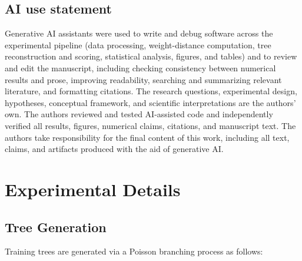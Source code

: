 \documentclass{article}
\theoremstyle{definition}
\theoremstyle{plain}
\begin{document}
\subsection*{AI use statement}
Generative AI assistants were used to write and debug software across the experimental
pipeline (data processing, weight-distance computation, tree reconstruction and scoring, statistical
analysis, figures, and tables) and to review and edit the manuscript, including checking consistency between numerical results and prose,
improving readability, searching and summarizing relevant literature, and formatting citations.  The research questions, experimental design,
hypotheses, conceptual framework, and scientific interpretations are the authors' own. The authors
reviewed and tested AI-assisted code and independently verified all results, figures, numerical claims,
citations, and manuscript text. The authors take responsibility for the final content of this work,
including all text, claims, and artifacts produced with the aid of generative AI.





\appendix

\section{Experimental Details}
\label{app:details}

\subsection*{Tree Generation}
\label{app:tree-gen}

Training trees are generated via a Poisson branching process as follows:
\end{document}
